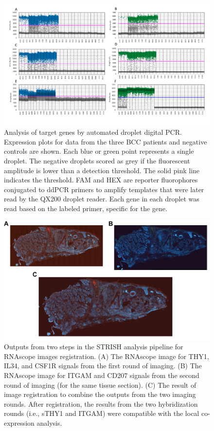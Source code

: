 \begin{figure}[htp]
    \centering
    \includegraphics[width=0.75\columnwidth]{Chapter2/Figures/Supplemental_Fig_S6.png}
    \caption{Analysis of target genes by automated droplet digital PCR. Expression plots for data from the three BCC patients and negative controls are shown. Each blue or green point represents a single droplet. The negative droplets scored as grey if the fluorescent amplitude is lower than a detection threshold. The solid pink line indicates the threshold. FAM and HEX are reporter fluorophores conjugated to ddPCR primers to amplify templates that were later read by the QX200 droplet reader. Each gene in each droplet was read based on the labeled primer, specific for the gene.  }
    \label{fig:Chap2_Supfigure6}
\end{figure}
\begin{figure}[htp]
    \centering
    \includegraphics[width=0.75\columnwidth]{Chapter2/Figures/Supplemental_Fig_S7.png}
    \caption{Outputs from two steps in the STRISH analysis pipeline for RNAscope images registration. (A) The RNAscope image for THY1, IL34, and CSF1R signals from the first round of imaging. (B) The RNAscope image for ITGAM and CD207 signals from the second round of imaging (for the same tissue section). (C) The result of image registration to combine the outputs from the two imaging rounds. After registration, the results from the two hybridization rounds (i.e., sTHY1 and ITGAM) were compatible with the local co-expression analysis.}
    \label{fig:Chap2_Supfigure7}
\end{figure}
\typeout{}

% 

% 